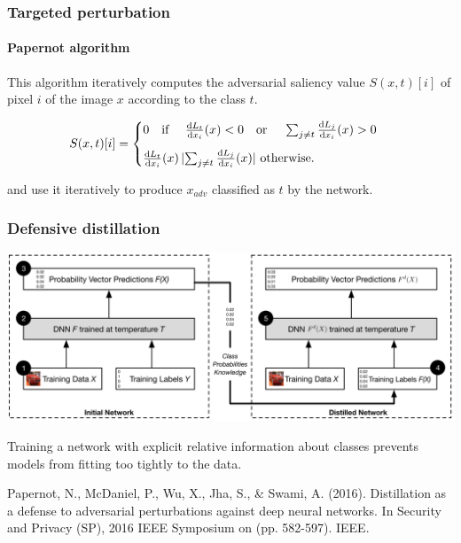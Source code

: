 \documentclass[9pt]{beamer}
\begin{document}
\begin{frame}
  \frametitle{Targeted perturbation}

  \framesubtitle{Papernot algorithm}

  This algorithm iteratively computes the adversarial saliency value
  $S(x, t)[i]$ of pixel $i$ of the image $x$ according to the class
  $t$.

  \medskip

  \[
  S(x, t)[i] =
  \begin{cases}
    0 \text{\quad if \quad} \frac{\mathrm{d} L_{t}}{\mathrm{d} x_{i}}(x) < 0
    \text{\quad or \quad} \sum_{j \neq t} \frac{\mathrm{d} L_{j}}{\mathrm{d} x_{i}}(x)
    > 0 \\[0.3cm]
    \frac{\mathrm{d} L_{t}}{\mathrm{d} x_{i}}(x) \, \lvert \sum_{j \neq
      t} \frac{\mathrm{d} L_{j}}{\mathrm{d} x_{i}}(x) \rvert \text{ otherwise.}
  \end{cases}
  \]

  \medskip

  and use it iteratively to produce $x_{adv}$ classified as $t$ by the
  network.

\end{frame}

\begin{frame}
  \frametitle{Defensive distillation}

  \begin{center}
    \includegraphics[width = 0.9\linewidth]{images/distillation.png}
  \end{center}

  \medskip

  Training a network with explicit relative information about classes
  prevents models from fitting too tightly to the data.

  \medskip

  {\scriptsize Papernot, N., McDaniel, P., Wu, X., Jha, S., \& Swami,
    A. (2016). Distillation as a defense to adversarial perturbations
    against deep neural networks. In Security and Privacy (SP), 2016
    IEEE Symposium on (pp. 582-597). IEEE.}

\end{frame}
\end{document}
